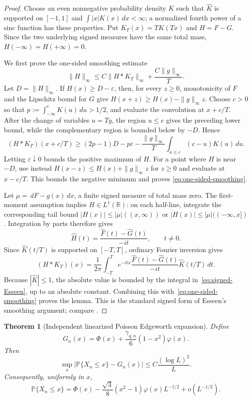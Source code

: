 \documentclass[11pt]{article}
\newtheorem{theorem}{Theorem}[section]
\theoremstyle{remark}
\newcommand{\Pp}{\mathbb P}
\newcommand{\dd}{\,d}
\begin{document}
\begin{proof}
Choose an even nonnegative probability density $K$ such that
$\widehat K$ is supported on $[-1,1]$ and
$\int |x|K(x)\dd x<\infty$; a normalized fourth power of a sinc function
has these properties.  Put $K_T(x)=TK(Tx)$ and $H=F-G$.  Since the two
underlying signed measures have the same total mass,
$H(-\infty)=H(+\infty)=0$.

We first prove the one-sided smoothing estimate
\begin{equation}
\label{eq:one-sided-smoothing}
 \|H\|_\infty
 \le C\|H*K_T\|_\infty+
 \frac{C\|g\|_\infty}{T}.
\end{equation}
Let $D=\|H\|_\infty$.  If $H(x)\ge D-\varepsilon$, then, for every
$z\ge0$, monotonicity of $F$ and the Lipschitz bound for $G$ give
$H(x+z)\ge H(x)-\|g\|_\infty z$.  Choose $c>0$ so that
$p:=\int_{-\infty}^cK(u)\dd u>1/2$, and evaluate the convolution at
$x+c/T$.  After the change of variables $u=Ty$, the region $u\le c$
gives the preceding lower bound, while the complementary region is bounded
below by $-D$.  Hence
\[
 (H*K_T)(x+c/T)
 \ge (2p-1)D-p\varepsilon-
 \frac{\|g\|_\infty}{T}
 \int_{u\le c}(c-u)K(u)\dd u.
\]
Letting $\varepsilon\downarrow0$ bounds the positive maximum of $H$.
For a point where $H$ is near $-D$, use instead
$H(x-z)\le H(x)+\|g\|_\infty z$ for $z\ge0$ and evaluate at $x-c/T$.
This bounds the negative minimum and proves
\eqref{eq:one-sided-smoothing}.

Let $\mu=\dd F-g(x)\dd x$, a finite signed measure of total mass zero.
The first-moment assumption implies $H\in L^1(\mathbb R)$: on each
half-line, integrate the corresponding tail bound
$|H(x)|\le |\mu|((x,\infty))$ or
$|H(x)|\le |\mu|(({-}\infty,x])$.  Integration by parts therefore gives
\[
 \widehat H(t)=
 \frac{\widehat F(t)-\widehat G(t)}{-it},
 \qquad t\ne0.
\]
Since $\widehat K(t/T)$ is supported on $[-T,T]$, ordinary Fourier
inversion gives
\[
 (H*K_T)(x)=\frac1{2\pi}
 \int_{-T}^{T}e^{-itx}
 \frac{\widehat F(t)-\widehat G(t)}{-it}
 \widehat K(t/T)\dd t.
\]
Because $|\widehat K|\le1$, the absolute value is bounded by the integral
in~\eqref{eq:signed-Esseen}, up to an absolute constant.  Combining this
with~\eqref{eq:one-sided-smoothing} proves the lemma.  This is the standard
signed form of Esseen's smoothing argument; compare
\cite[Chapter~VI]{Petrov1975}.
\end{proof}

\begin{theorem}[Independent linearized Poisson Edgeworth expansion]
\label{thm:poisson-edgeworth}
Define
\[
 G_n(x)=\Phi(x)+\frac{\gamma_{q,n}}6(1-x^2)\varphi(x).
\]
Then
\begin{equation}
\label{eq:poisson-edgeworth-rate}
 \sup_x\left|
 \Pp\{X_n\le x\}-G_n(x)
 \right|
 \le C\frac{(\log L)^2}{L}.
\end{equation}
Consequently, uniformly in $x$,
\begin{equation}
\label{eq:poisson-edgeworth-asymp}
 \Pp\{X_n\le x\}
 =\Phi(x)-\frac{\sqrt3}{8}(x^2-1)\varphi(x)L^{-1/2}
 +o(L^{-1/2}).
\end{equation}
\end{theorem}
\end{document}
